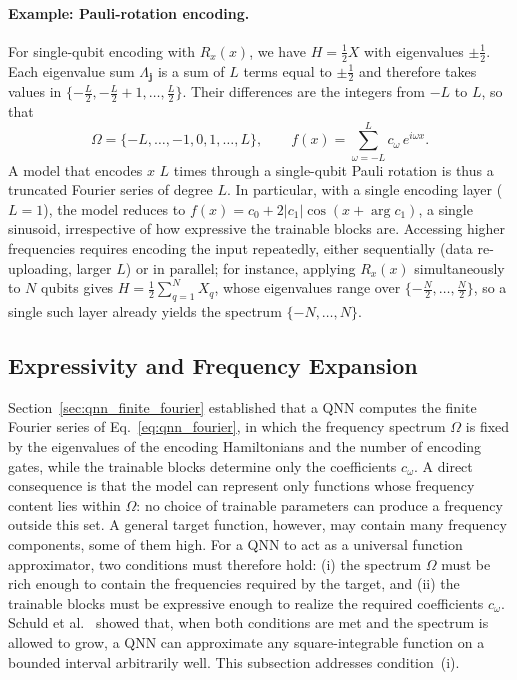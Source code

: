 \documentclass[12pt]{article}
\numberwithin{equation}{section}  %
\begin{document}
\paragraph{Example: Pauli-rotation encoding.} For single-qubit encoding with $R_x(x)$, we have $H = \frac{1}{2}X$ with eigenvalues $\pm\frac{1}{2}$. Each eigenvalue sum $\Lambda_{\mathbf{j}}$ is a sum of $L$ terms equal to $\pm\frac{1}{2}$ and therefore takes values in $\{-\frac{L}{2}, -\frac{L}{2}+1, \ldots, \frac{L}{2}\}$. Their differences are the integers from $-L$ to $L$, so that
\begin{equation}
\Omega = \{-L, \ldots, -1, 0, 1, \ldots, L\}, \qquad
f(x) = \sum_{\omega=-L}^{L} c_\omega\, e^{i\omega x}.
\end{equation}
A model that encodes $x$ $L$ times through a single-qubit Pauli rotation is thus a truncated Fourier series of degree $L$. In particular, with a single encoding layer ($L = 1$), the model reduces to $f(x) = c_0 + 2|c_1|\cos(x + \arg c_1)$, a single sinusoid, irrespective of how expressive the trainable blocks are. Accessing higher frequencies requires encoding the input repeatedly, either sequentially (data re-uploading, larger $L$) or in parallel; for instance, applying $R_x(x)$ simultaneously to $N$ qubits gives $H = \frac{1}{2}\sum_{q=1}^{N} X_q$, whose eigenvalues range over $\{-\frac{N}{2}, \ldots, \frac{N}{2}\}$, so a single such layer already yields the spectrum $\{-N, \ldots, N\}$.

\subsection{Expressivity and Frequency Expansion}
\label{sec:freq_expansion}

Section~\ref{sec:qnn_finite_fourier} established that a QNN computes the finite Fourier series of Eq.~\eqref{eq:qnn_fourier}, in which the frequency spectrum $\Omega$ is fixed by the eigenvalues of the encoding Hamiltonians and the number of encoding gates, while the trainable blocks determine only the coefficients $c_\omega$. A direct consequence is that the model can represent only functions whose frequency content lies within $\Omega$: no choice of trainable parameters can produce a frequency outside this set. A general target function, however, may contain many frequency components, some of them high. For a QNN to act as a universal function approximator, two conditions must therefore hold: (i) the spectrum $\Omega$ must be rich enough to contain the frequencies required by the target, and (ii) the trainable blocks must be expressive enough to realize the required coefficients $c_\omega$. Schuld et al.~\cite{schuld2021effect} showed that, when both conditions are met and the spectrum is allowed to grow, a QNN can approximate any square-integrable function on a bounded interval arbitrarily well. This subsection addresses condition~(i).
\end{document}
